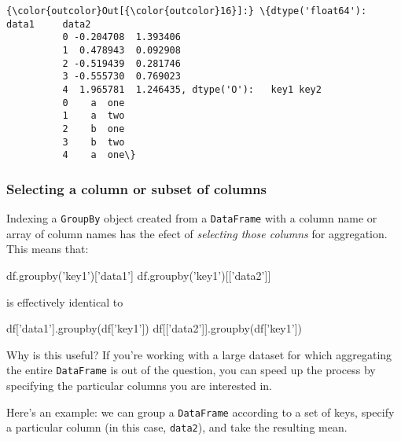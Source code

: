 \documentclass{article}
\newenvironment{Shaded}{}{}
\newcommand{\StringTok}[1]{\textcolor[rgb]{0.25,0.44,0.63}{{#1}}}
\newcommand{\NormalTok}[1]{{#1}}
\begin{document}
            \begin{Verbatim}[commandchars=\\\{\}]
{\color{outcolor}Out[{\color{outcolor}16}]:} \{dtype('float64'):       data1     data2
          0 -0.204708  1.393406
          1  0.478943  0.092908
          2 -0.519439  0.281746
          3 -0.555730  0.769023
          4  1.965781  1.246435, dtype('O'):   key1 key2
          0    a  one
          1    a  two
          2    b  one
          3    b  two
          4    a  one\}
\end{Verbatim}
        
    \subsubsection{Selecting a column or subset of
columns}\label{selecting-a-column-or-subset-of-columns}

    Indexing a \texttt{GroupBy} object created from a \texttt{DataFrame}
with a column name or array of column names has the efect of
\emph{selecting those columns} for aggregation. This means that:

\begin{Shaded}
\begin{Highlighting}[]
\NormalTok{df.groupby(}\StringTok{'key1'}\NormalTok{)[}\StringTok{'data1'}\NormalTok{]}
\NormalTok{df.groupby(}\StringTok{'key1'}\NormalTok{)[[}\StringTok{'data2'}\NormalTok{]]}
\end{Highlighting}
\end{Shaded}

is effectively identical to

\begin{Shaded}
\begin{Highlighting}[]
\NormalTok{df[}\StringTok{'data1'}\NormalTok{].groupby(df[}\StringTok{'key1'}\NormalTok{])}
\NormalTok{df[[}\StringTok{'data2'}\NormalTok{]].groupby(df[}\StringTok{'key1'}\NormalTok{])}
\end{Highlighting}
\end{Shaded}

    Why is this useful? If you're working with a large dataset for which
aggregating the entire \texttt{DataFrame} is out of the question, you
can speed up the process by specifying the particular columns you are
interested in.

    Here's an example: we can group a \texttt{DataFrame} according to a set
of keys, specify a particular column (in this case, \texttt{data2}), and
take the resulting mean.
\end{document}
